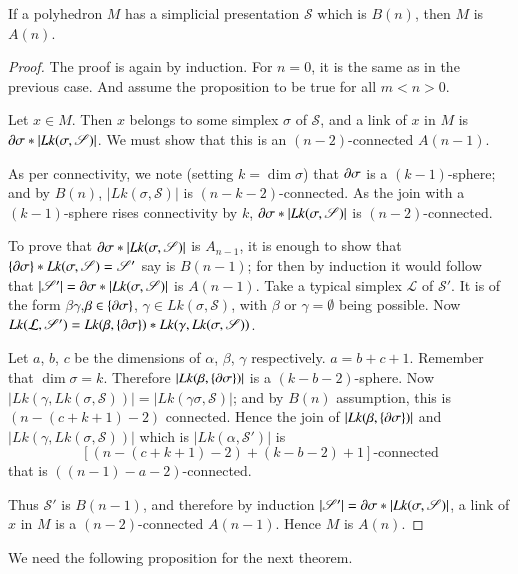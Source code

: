 \begin{proposition}\label{chap5-prop5.3.5}
If a polyhedron $M$ has a simplicial presentation $\mathscr{S}$ which is $B(n)$, then $M$ is $A(n)$.
\end{proposition}

\begin{proof}
The proof is again by induction. For $n=0$, it is the same as in the previous case. And assume the proposition to be true for all $m<n>0$.

Let $x\in M$. Then $x$ belongs to some simplex $\sigma$ of $\mathscr{S}$, and a link of $x$ in $M$ is $\partial \sigma\ast|Lk(\sigma,\mathscr{S})|$. We must show that this is an $(n-2)$-connected $A(n-1)$.

As per connectivity, we note (setting $k=\dim \sigma$) that $\partial \sigma$ is a $(k-1)$-sphere; and by $B(n)$, $|Lk(\sigma,\mathscr{S})|$ is $(n-k-2)$-connected. As the join with a $(k-1)$-sphere rises connectivity by $k$, $\partial \sigma\ast|Lk(\sigma,\mathscr{S})|$ is $(n-2)$-connected.

To prove that $\partial \sigma\ast |Lk(\sigma,\mathscr{S})|$ is $A_{n-1}$, it is enough to show that $\{\partial \sigma\}\ast Lk(\sigma,\mathscr{S})=\mathscr{S}'$ say is $B(n-1)$; for then by induction it would follow that $|\mathscr{S}'|=\partial \sigma\ast|Lk(\sigma,\mathscr{S})|$ is $A(n-1)$. Take a typical simplex $\mathcal{L}$ of $\mathscr{S}'$. It is of the form $\beta\gamma$,\pageoriginale $\beta\in \{\partial \sigma\}$, $\gamma\in Lk(\sigma,\mathscr{S})$, with $\beta$ or $\gamma=\emptyset$ being possible. Now $Lk(\mathcal{L},\mathscr{S}')=Lk(\beta,\{\partial \sigma\})\ast Lk(\gamma,Lk(\sigma,\mathscr{S}))$. 

Let $a$, $b$, $c$ be the dimensions of $\alpha$, $\beta$, $\gamma$ respectively. $a=b+c+1$. Remember that $\dim \sigma=k$. Therefore $|Lk(\beta,\{\partial \sigma\})|$ is a $(k-b-2)$-sphere. Now $|Lk(\gamma,Lk(\sigma,\mathscr{S}))|=|Lk(\gamma\sigma,\mathscr{S})|$; and by $B(n)$ assumption, this is $(n-(c+k+1)-2)$ connected. Hence the join of $|Lk(\beta,\{\partial \sigma\})|$ and $|Lk(\gamma,Lk(\sigma,\mathscr{S}))|$ which is $|Lk(\alpha,\mathscr{S}')|$ is 
$$
[(n-(c+k+1)-2)+(k-b-2)+1]\text{-connected}
$$
that is $((n-1)-a-2)$-connected.

Thus $\mathscr{S}'$ is $B(n-1)$, and therefore by induction $|\mathscr{S}'|=\p \sigma\ast\break|Lk(\sigma,\mathscr{S})|$, a link of $x$ in $M$ is a $(n-2)$-connected $A(n-1)$. Hence $M$ is $A(n)$.
\end{proof}

We need the following proposition for the next theorem.

